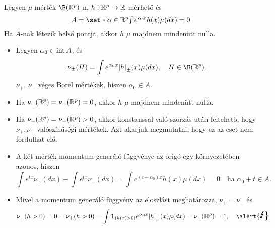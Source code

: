 \documentclass[aspectratio=169,notheorems,9pt,\option]{beamer}
\begin{document}
\begin{frame}%
  \begin{theorem}
    Legyen $\mu$ mérték $\B (\real^p)$-n, $h:\mathbb{R}^p\to\mathbb{R}$ mérhető és 
    \begin{displaymath}\textstyle
      A=\set*{\alpha\in\real^p}{\int e^{\alpha \cdot x}h (x)\mu
        (dx)=0}%
    \end{displaymath}
    Ha $A$-nak létezik belső pontja, akkor $h$ $\mu$ majdnem mindenütt nulla.
  \end{theorem}
  \begin{itemize}
  \item Legyen $\alpha_0\in\operatorname{int} A$, és
    \begin{displaymath}
      \nu_{\pm} (H)=\int e^{\alpha_0x}\abs*{h}_\pm (x) \mu (d x),\quad H\in\B(\real^p).
    \end{displaymath}
    $\nu_{+}$, $\nu_{-}$ véges Borel mértékek,  hiszen $\alpha_0\in A$.
  \item  Ha $\nu_{+} (\mathbb{R}^p)=\nu_{-} (\mathbb{R}^p) = 0$, akkor $h$ $\mu$ majdnem mindenütt
    nulla.
  \item Ha $\nu_{+}(\mathbb{R}^p)=\nu_{-} (\mathbb{R}^p)>0$, akkor konstanssal
    való szorzás után feltehető, hogy $\nu_{+},\nu_{-}$ valószínűségi
    mértékek. Azt akarjuk megmutatni, hogy ez az eset nem fordulhat
    elő. 
    
  \item A két mérték momentum generáló függvénye az origó egy
    környezetében azonos, hiszen
    \begin{displaymath}
      \int e^{t x}\nu_{+} (d x)-\int e^{t x}\nu_{-} (d x)=\int
      e^{(t+\alpha_0)x}h (x)\mu (d x)=0
          \quad\text{ha $\alpha_0+t\in A$.}
    \end{displaymath}
  \item Mivel a momentum generáló függvény az eloszlást meghatározza,
    $\nu_{+}=\nu_{-}$ és %
    \begin{displaymath}
      \nu_{-} (h>0)=0=\nu_{+}(h>0)=
      \int \I{h (x) >0} e^{\alpha_0 x}\abs*{h}_+ (x)\mu (d x)=
      \nu_{+} (\real^p)=1,
      \quad\text{\alert{\Large\Lightning}}
    \end{displaymath}
  \end{itemize}
\end{frame}
\end{document}
